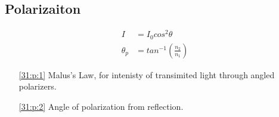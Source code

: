 \documentclass{subfile}
\begin{document}
\subsection{Polarizaiton}
\begin{align}
  I &= I_0 cos^2\theta \label{31:p:1}\\
  \theta_p &= tan^{-1}\left(\frac{n_2}{n_1}\right) \label{31:p:2}
\end{align}
\begin{enumerate}
  \item[\eqref{31:p:1}] Malus's Law, for intenisty of transimited light through angled polarizers.
  \item[\eqref{31:p:2}] Angle of polarization from reflection.
\end{enumerate}
\end{document}
